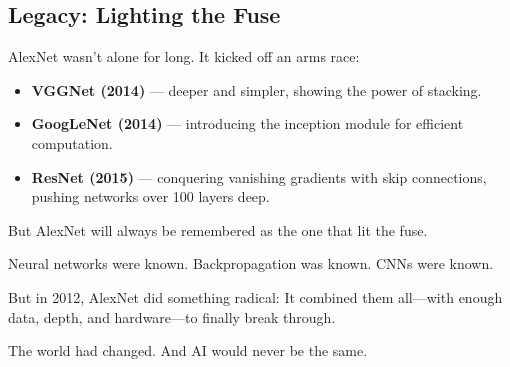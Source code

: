 \subsection{Legacy: Lighting the Fuse}

AlexNet wasn’t alone for long. It kicked off an arms race:
\begin{itemize}
  \item \textbf{VGGNet (2014)} — deeper and simpler, showing the power of stacking.
  \item \textbf{GoogLeNet (2014)} — introducing the inception module for efficient computation.
  \item \textbf{ResNet (2015)} — conquering vanishing gradients with skip connections, pushing networks over 100 layers deep.
\end{itemize}

But AlexNet will always be remembered as the one that lit the fuse.

\begin{tcolorbox}[colback=blue!5!white, colframe=blue!50!black, title={AlexNet: From Curiosity to Conquest}]
Neural networks were known.  
Backpropagation was known.  
CNNs were known.  

But in 2012, AlexNet did something radical:  
It combined them all—with enough data, depth, and hardware—to finally break through.  

The world had changed.  
And AI would never be the same.
\end{tcolorbox}
